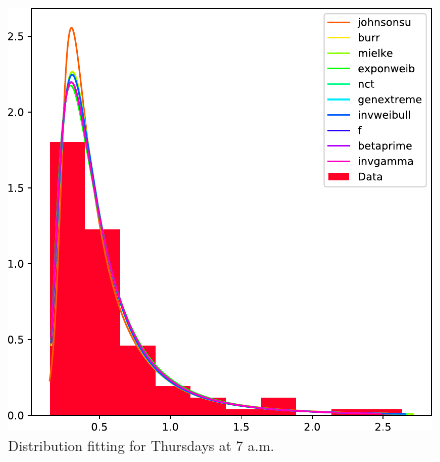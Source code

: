 	\begin{figure}[H]
	    \centering
	    \includegraphics[scale=0.45]{files/test-fitting.pdf}
	    \caption{Distribution fitting for Thursdays at 7 a.m.}
	    \label{fig:dist_fit}
	\end{figure}